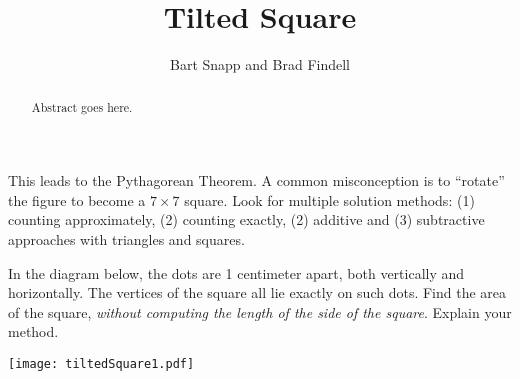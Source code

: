 \documentclass{ximera}
\title{Tilted Square}
\author{Bart Snapp and Brad Findell}
\begin{document}
\begin{abstract}
Abstract goes here.  
\end{abstract}
\maketitle


\begin{teachingnote}
This leads to the Pythagorean Theorem.  A common misconception is to ``rotate'' the figure to become a $7\times 7$ square.  Look for multiple solution methods:  (1) counting approximately, (2) counting exactly, (2) additive and (3) subtractive approaches with triangles and squares.
\end{teachingnote}

\begin{problem}
In the diagram below, the dots are 1 centimeter apart, both vertically and horizontally.  The vertices of the square all lie exactly on such dots. Find the area of the square, \emph{without computing the length of the side of the square}.  Explain your method.  

\begin{image}
\texttt{[image: tiltedSquare1.pdf]}
\end{image}

\end{problem}
\end{document}
